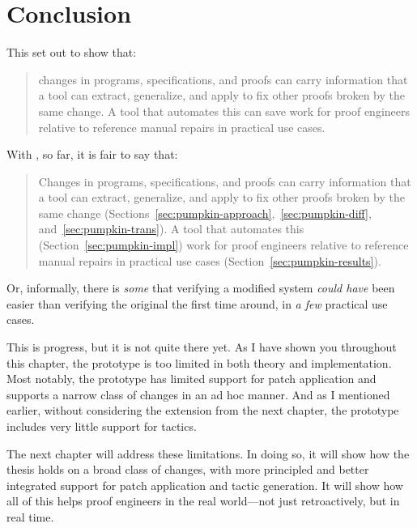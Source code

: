 \section{Conclusion}
\label{sec:pumpkin-concl}

This  set out to show that:

\begin{quote}
changes in programs, specifications, and proofs can carry information that a tool can extract, generalize, and apply to fix other proofs broken by the same change. A tool that automates this can save work for proof engineers relative to reference manual repairs in practical use cases.
\end{quote}
With \sysname, so far, it is fair to say that:

\begin{quote}
Changes in  programs, specifications, and proofs can carry information that a tool can extract, generalize, and  apply to fix other proofs broken by the same change (Sections~\ref{sec:pumpkin-approach},~\ref{sec:pumpkin-diff}, and~\ref{sec:pumpkin-trans}). A tool that automates this (Section~\ref{sec:pumpkin-impl})  work for proof engineers relative to reference manual repairs in  practical use cases (Section~\ref{sec:pumpkin-results}).
\end{quote}
Or, informally, there is \textit{some}  that verifying a modified system \textit{could have} been easier than verifying the original the first time around,
in \textit{a few} practical use cases.

This is progress, but it is not quite there yet.
As I have shown you throughout this chapter, the \sysname prototype is too limited in both theory and implementation.
Most notably, the \sysname prototype has limited support for patch application and supports
a narrow class of changes in an ad hoc manner.
And as I mentioned earlier, without considering the extension from the next chapter, 
the \sysname prototype includes very little support for tactics.

The next chapter will address these limitations.
In doing so, it will show how the thesis holds on a broad class of changes,
with more principled and better integrated support for patch application and tactic generation.
It will show how all of this helps proof engineers in the real world---not just retroactively,
but in real time.






